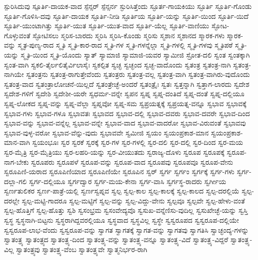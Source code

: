 {ಸ್ಪುರಿಸಿದುವು
ಸ್ಪೂರ್ತಿ-ದಾಯಕ-ವಾದ
ಸ್ಪೆನ್ಸರ್
ಸ್ಪೆನ್ಸರ್ನ
ಸ್ಫುರಿಸಿತ್ತೆಂದು
ಸ್ಫೂರ್ತ-ಗಾಯಕಿಯು
ಸ್ಫೂರ್ತಿ
ಸ್ಫೂರ್ತಿ-ಗೊಂಡು
ಸ್ಫೂರ್ತಿ-ಗೊಳಿಸಿ-ದವು
ಸ್ಫೂರ್ತಿ-ದಾಯಕ
ಸ್ಫೂರ್ತಿ-ನೀಡಿ
ಸ್ಫೂರ್ತಿಯ
ಸ್ಫೂರ್ತಿ-ಯನ್ನು
ಸ್ಫೂರ್ತಿ-ಯಿಂದ
ಸ್ಫೂರ್ತಿ-ಯಿದೆ
ಸ್ಫೂರ್ತಿ-ಯುಂಟಾಗಿತ್ತು
ಸ್ಫೂರ್ತಿ-ಯುತ
ಸ್ಫೂರ್ತಿ-ಯುತ-ವಾದ
ಸ್ಫೂರ್ತಿ-ಯೆಲ್ಲ
ಸ್ಫೂರ್ತಿ-ವಾಣಿಯು
ಸ್ಫೋಟ-ಗೊಳ್ಳುವಂತೆ
ಸ್ಫೋಟಿಸಲು
ಸ್ಮರಿಸ-ಬಾರದು
ಸ್ಮರಿಸಿ
ಸ್ಮರಿಸಿ-ಕೊಂಡು
ಸ್ಮರಿಸು
ಸ್ಮಶಾನ
ಸ್ಮಶಾನದ
ಸ್ಮಾರಕ-ಗಳು
ಸ್ಮಾರಕ-ವನ್ನು
ಸ್ಮೃತ-ಪುಣ್ಯ-ರಾದ
ಸ್ಮೃತಿ
ಸ್ಮೃತಿ-ಕಾರ-ರಾದ
ಸ್ಮೃತಿ-ಗಳ
ಸ್ಮೃತಿ-ಗಳನ್ನೆಲ್ಲಾ
ಸ್ಮೃತಿ-ಗಳಲ್ಲಿ
ಸ್ಮೃತಿ-ಗಳವು
ಸ್ಮೃತಿಪಠೆ
ಸ್ಮೃತಿ-ಯನ್ನು
ಸ್ಮೃತಿ-ಯಿಂದ
ಸ್ಮೃತಿ-ಯೊಂದು
ಸ್ಯಾತ್
ಸ್ಯಾಮಾಜಿ
ಸ್ಯಾಮಾಜಿ-ಯವರ
ಸ್ಯಾಮೀಜಿ
ಸ್ರೋತ-ದಲಿ
ಸ್ವಂತ
ಸ್ವಂತಕ್ಕಾಗಿ
ಸ್ವಂತ-ವಾಗಿ
ಸ್ವಕಲಿ-ತೈರ್ಲಲಿತೈರ್ವಿಲಾಸೈಃ
ಸ್ವಕಲ್ಪಿತ
ಸ್ವಚ್ಛ
ಸ್ವಚ್ಛಂದ
ಸ್ವಚ್ಛ-ವಾದೊಂದು
ಸ್ವತಂತ್ರ
ಸ್ವತಂತ್ರ-ನಾಗಿ
ಸ್ವತಂತ್ರ-ನಾಗಿಯೇ
ಸ್ವತಂತ್ರನು
ಸ್ವತಂತ್ರ-ರಾಗುತ್ತೇವೆಂದು
ಸ್ವತಂತ್ರರು
ಸ್ವತಂತ್ರ-ವಲ್ಲ
ಸ್ವತಂತ್ರ-ವಾಗಿ
ಸ್ವತಂತ್ರ-ವಾಗಿರು-ವುದೊಂದು
ಸ್ವತಂತ್ರ-ವಾದ
ಸ್ವತಂತ್ರಾಲೋಚನೆ-ಯಿಲ್ಲದೆ
ಸ್ವತಂತ್ರೇಚ್ಛೆ-ಅಂದರೆ
ಸ್ವತಂತ್ರೈಃ
ಸ್ವತಃ
ಸ್ವತ್ತನ್ನಾಗಿ
ಸ್ವತ್ತಾಗ-ಲಾರದು
ಸ್ವದೇಶ
ಸ್ವದೇಶ-ಗಳಿಗೆ
ಸ್ವದೇಶಿ
ಸ್ವದೇಶೀ-ಯರೇ
ಸ್ವಧರ್ಮ-ವನ್ನೇ
ಸ್ವಪನ
ಸ್ವಪ್ನ
ಸ್ವಪ್ನ-ದಂತಿದೆ
ಸ್ವಪ್ನ-ದಂತೆ
ಸ್ವಪ್ನ-ದಲ್ಲಿಯೂ
ಸ್ವಪ್ನ-ಲೋಕದ
ಸ್ವಪ್ನ-ವನ್ನು
ಸ್ವಪ್ನ-ವೆಲ್ಲಾ
ಸ್ವಪ್ನವೋ
ಸ್ವಪ್ನ-ಸಮ
ಸ್ವಪ್ರಯತ್ನಕ್ಕೆ
ಸ್ವಪ್ರಯತ್ನ-ವನ್ನೂ
ಸ್ವಭಾವ
ಸ್ವಭಾವಕ್ಕೆ
ಸ್ವಭಾವ-ಗಳು
ಸ್ವಭಾವ-ಗಳೂ
ಸ್ವಭಾವತಃ
ಸ್ವಭಾವದ
ಸ್ವಭಾವ-ದಲ್ಲಿ
ಸ್ವಭಾವ-ದವರು
ಸ್ವಭಾವ-ದವರೇ
ಸ್ವಭಾವ-ದಿಂದ
ಸ್ವಭಾವ-ವನ್ನು
ಸ್ವಭಾವ-ವನ್ನೆಲ್ಲ
ಸ್ವಭಾವ-ವನ್ನೇ
ಸ್ವಭಾವ-ವಾದ
ಸ್ವಭಾವ-ವಾದರೋ
ಸ್ವಭಾವ-ವಿರುವಂತೆ
ಸ್ವಭಾವವು
ಸ್ವಭಾವ-ವುಳ್ಳ-ವರೋ
ಸ್ವಭಾವ-ವೆನ್ನು-ವುದು
ಸ್ವಭಾವವೇ
ಸ್ವಮೀಜಿ
ಸ್ವಯಂ
ಸ್ವಯಂಪ್ರಕಾಶ-ಮಾನ
ಸ್ವಯಂಪ್ರಕಾಶ-ಮಾನ-ವಾಗಿ
ಸ್ವಯಂಭೂಃ
ಸ್ವರ
ಸ್ವರಕೆ
ಸ್ವರಕ್ಕೆ
ಸ್ವರ-ಗಳ
ಸ್ವರ-ಗಳಲ್ಲಿ
ಸ್ವರ-ದಲಿ
ಸ್ವರ-ದಲ್ಲಿ
ಸ್ವರ-ದಿಂದ
ಸ್ವರ-ಮಯ
ಸ್ವರ-ಮೈತ್ರಿ
ಸ್ವರ-ಮೈತ್ರಿಯು
ಸ್ವರ-ಲಹರಿ-ಯನ್ನು
ಸ್ವರ-ವೀಯುತದು
ಸ್ವರಾಜ್ಯ-ದೊಳು
ಸ್ವರೂಪ
ಸ್ವರೂಪಕ್ಕೆ
ಸ್ವರೂಪ-ನಾಗ-ಬೇಕು
ಸ್ವರೂಪರು
ಸ್ವರೂಪಳೆ
ಸ್ವರೂಪ-ವನ್ನು
ಸ್ವರೂಪ-ವಾದ
ಸ್ವರೂಪವು
ಸ್ವರೂಪವೂ
ಸ್ವರೂಪ-ವೇನು
ಸ್ವರೂಪಿಣಿ-ಯರಾದ
ಸ್ವರೂಪಿಣಿಯಾದ
ಸ್ವರೂಪಿಣಿಯೇ
ಸ್ವರೂಪಿನ
ಸ್ವರ್
ಸ್ವರ್ಗ
ಸ್ವರ್ಗಂ
ಸ್ವರ್ಗಕ್ಕೆ
ಸ್ವರ್ಗ-ಗಳು
ಸ್ವರ್ಗ-ದಲ್ಲಾ-ಗಲಿ
ಸ್ವರ್ಗ-ದಲ್ಲಿಯೂ
ಸ್ವರ್ಗದ್ವಾರ
ಸ್ವರ್ಗ-ಮಯ-ಕೇನಾ
ಸ್ವರ್ಗ-ವಾಸಿ
ಸ್ವರ್ಗಸ್ಥ-ರಾದರು
ಸ್ವರ್ಗೀಯ
ಸ್ವರ್ಣತುಲಿಕರ
ಸ್ವರ್ಣ-ಪಾತ್ರೆ-ಯಲ್ಲಿ
ಸ್ವರ್ಣಸ್ವಪ್ನವ
ಸ್ವಲ್ಪ
ಸ್ವಲ್ಪ-ಕಾಲ
ಸ್ವಲ್ಪ-ಕಾಲಕ್ಕೆ
ಸ್ವಲ್ಪ-ಕಾಲದ
ಸ್ವಲ್ಪ-ದರಲ್ಲಿಯೆ
ಸ್ವಲ್ಪ-ದರಲ್ಲೇ
ಸ್ವಲ್ಪ-ಮಟ್ಟಿ-ಗಾದರೂ
ಸ್ವಲ್ಪ-ಮಟ್ಟಿಗೆ
ಸ್ವಲ್ಪ-ವನ್ನು
ಸ್ವಲ್ಪ-ವಿದ್ದು-ವೇನು
ಸ್ವಲ್ಪವೂ
ಸ್ವಲ್ಪವೇ
ಸ್ವಲ್ಪ-ಹೇಳು-ವಂತೆ
ಸ್ವಲ್ಪ-ಹೊತ್ತಿಗೆ
ಸ್ವಲ್ಪ-ಹೊತ್ತು
ಸ್ವಶಿ
ಸ್ವಸಂಭ್ರಮ
ಸ್ವಸಂವೇದ್ಯವೊ
ಸ್ವಸುಖ-ವನ್ನೆಣಿಸು-ವುದಿಲ್ಲ
ಸ್ವಸುಖೇಚ್ಛೆ-ಯನ್ನು
ಸ್ವಸ್ತಿ
ಸ್ವಸ್ಥ
ಸ್ವಸ್ಥನಾಗಿ-ಬಿಟ್ಟನು
ಸ್ವಸ್ಥರಾಗಿದ್ದವರಲ್ಲಿಯೂ
ಸ್ವಸ್ಥವಾದ
ಸ್ವಸ್ಥವಿಲ್ಲ
ಸ್ವಸ್ಥೇ
ಸ್ವಸ್ವರೂಪದ
ಸ್ವಸ್ವರೂಪ-ದಲ್ಲಿಯೇ
ಸ್ವಸ್ವರೂಪ-ಲಾಭ-ವೆಂದು
ಸ್ವಸ್ವರೂಪ-ವನ್ನು
ಸ್ವಾಗತ
ಸ್ವಾಗತಕ್ಕೆ
ಸ್ವಾಗತ-ವನ್ನು
ಸ್ವಾಗತವು
ಸ್ವಾಗತಿಸಿ
ಸ್ವಾಚ್ಛಂದ್ಯ-ಗಳನ್ನು
ಸ್ವಾತಂತ್ರ್ಯ
ಸ್ವಾತಂತ್ರ್ಯದ
ಸ್ವಾತಂತ್ರ್ಯ-ದಿಂದ
ಸ್ವಾತಂತ್ರ್ಯ-ವನ್ನು
ಸ್ವಾತಂತ್ರ್ಯ-ವನ್ನೂ
ಸ್ವಾತಂತ್ರ್ಯ-ವಿದೆ
ಸ್ವಾತಂತ್ರ್ಯ-ವಿದ್ದರೆ
ಸ್ವಾತಂತ್ರ್ಯ-ವಿಲ್ಲ
ಸ್ವಾತಂತ್ರ್ಯವು
ಸ್ವಾತಂತ್ರ್ಯ-ವೆಂಬ
ಸ್ವಾತಂತ್ರ್ಯವೇ
ಸ್ವಾತ್ಮನಿರ್ಭರ-ರಾಗಿ
}
